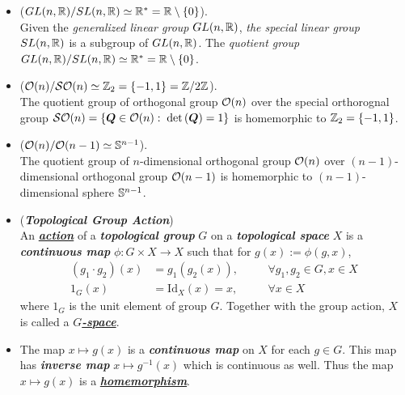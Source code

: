 \documentclass[11pt]{article}
\begin{document}
\begin{itemize}
\item \begin{example} ($GL(n, {\mathbb R})/SL(n, {\mathbb R}) \simeq {\mathbb R}^{*} = {\mathbb R} \setminus \left\{0\right\}$).\\
Given the \emph{generalized linear group} $GL(n, {\mathbb R})$, \emph{the special linear group} $SL(n, {\mathbb R})$ is a subgroup of $GL(n, {\mathbb R})$. The \emph{quotient group} $GL(n, {\mathbb R})/SL(n, {\mathbb R}) \simeq {\mathbb R}^{*} = {\mathbb R} \setminus \left\{0\right\}$.
\end{example}

\item \begin{example}  (${\mathcal O}(n)/{\mathcal S}{\mathcal O}(n) \simeq {\mathbb Z}_{2} =\left\{-1, 1\right\} = {\mathbb Z} / 2{\mathbb Z}$).\\
The quotient group of orthogonal group ${\mathcal O}(n)$ over the special orthorognal group ${\mathcal S}{\mathcal O}(n) = \left\{\boldsymbol{Q}\in {\mathcal O}(n):\;  \det\left(\boldsymbol{Q}\right)= 1\right\}$ is homemorphic to ${\mathbb Z}_{2} = \left\{-1, 1\right\}$.
\end{example}


\item \begin{example}  (${\mathcal O}(n)/{\mathcal O}(n-1) \simeq {\mathbb S}^{n-1}$).\\
The quotient group of $n$-dimensional orthogonal group ${\mathcal O}(n)$ over $(n-1)$-dimensional orthogonal group ${\mathcal O}(n-1)$  is homemorphic to $(n-1)$-dimensional sphere ${\mathbb S}^{n-1}$.
\end{example}

\item \begin{definition} (\emph{\textbf{Topological Group Action}})\\
An \underline{\emph{\textbf{action}}} of a \emph{\textbf{topological group}} $G$ on a \emph{\textbf{topological space}} $X$ is a \emph{\textbf{continuous map}} $\phi: G \times X \rightarrow X$ such that for $g(x):= \phi(g, x)$, 
\begin{align*}
(g_1 \cdot g_2)(x)  &= g_1(g_2(x)), && \quad \forall g_1, g_2 \in G, x\in X\\
1_{G}(x) &= \text{Id}_{X}(x) = x, &&\quad \forall x\in X
\end{align*} where $1_{G}$ is the unit element of group $G$. Together with the group action, $X$ is called a \underline{\emph{\textbf{$G$-space}}}.
\end{definition}

\item \begin{remark}
The map $x \mapsto g(x)$ is a \emph{\textbf{continuous map}} on $X$ for each $g\in G$. This map has \emph{\textbf{inverse map}} $x \mapsto g^{-1}(x)$ which is continuous as well. Thus the map $x \mapsto g(x)$ is a \underline{\emph{\textbf{homemorphism}}}.
\end{remark}


\end{itemize}
\end{document}
